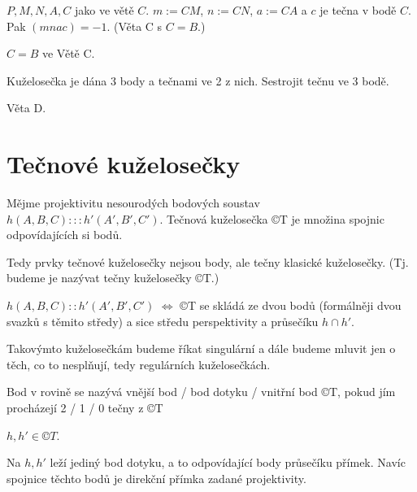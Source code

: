 \documentclass[12pt]{article}					%
\begin{document}
\begin{veta}[D]
	$P, M, N, A, C$ jako ve větě $C$. $m:=CM$, $n:=CN$, $a:=CA$ a $c$ je tečna v bodě $C$. Pak $(mnac) = -1$. (Věta C s $C = B$.)

	\begin{dukazin}
		$C = B$ ve Větě C.
	\end{dukazin}
\end{veta}

\begin{priklad}[Konstrukce]
	Kuželosečka je dána 3 body a tečnami ve 2 z nich. Sestrojit tečnu ve 3 bodě.

	\begin{reseni}
		Věta D.
	\end{reseni}
\end{priklad}


\section{Tečnové kuželosečky}
\begin{definice}
	Mějme projektivitu nesourodých bodových soustav $h(A, B, C):::h'(A', B', C')$. Tečnová kuželosečka ©T je množina spojnic odpovídajících si bodů.

	\begin{poznamkain}
		Tedy prvky tečnové kuželosečky nejsou body, ale tečny klasické kuželosečky. (Tj. budeme je nazývat tečny kuželosečky ©T.)
	\end{poznamkain}
\end{definice}

\begin{veta}
	$h(A, B, C)::h'(A', B', C')$ $\Leftrightarrow$ ©T se skládá ze dvou bodů (formálněji dvou svazků s těmito středy) a sice středu perspektivity a průsečíku $h \cap h'$.
\end{veta}

\begin{poznamkain}
	Takovýmto kuželosečkám budeme říkat singulární a dále budeme mluvit jen o těch, co to nesplňují, tedy regulárních kuželosečkách.
\end{poznamkain}

\begin{definice}[Vnější, ]
	Bod v rovině se nazývá vnější bod / bod dotyku / vnitřní bod ©T, pokud jím procházejí 2 / 1 / 0 tečny z ©T
\end{definice}

\begin{dusledek}
	$h, h' \in ©T$.

	Na $h, h'$ leží jediný bod dotyku, a to odpovídající body průsečíku přímek. Navíc spojnice těchto bodů je direkční přímka zadané projektivity.
\end{dusledek}
\end{document}
